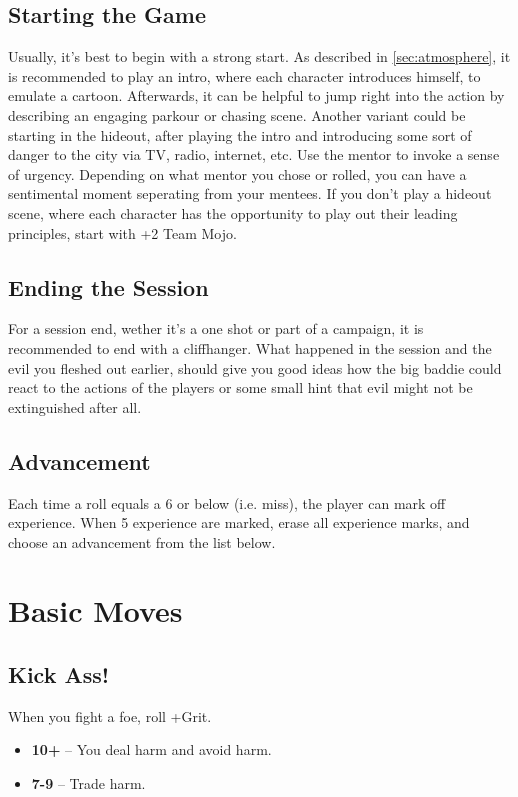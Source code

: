 \documentclass{book}
\begin{document}
\section*{Starting the Game}
Usually, it's best to begin with a strong start.
As described in \autoref{sec:atmosphere}, it is recommended to play an intro, where each character introduces himself, to emulate a cartoon.
Afterwards, it can be helpful to jump right into the action by describing an engaging parkour or chasing scene.
Another variant could be starting in the hideout, after playing the intro and introducing some sort of danger to the city via TV, radio, internet, etc.
Use the mentor to invoke a sense of urgency.
Depending on what mentor you chose or rolled, you can have a sentimental moment seperating from your mentees.
If you don't play a hideout scene, where each character has the opportunity to play out their leading principles, start with +2 Team Mojo.

\section*{Ending the Session}
For a session end, wether it's a one shot or part of a campaign, it is recommended to end with a cliffhanger.
What happened in the session and the evil you fleshed out earlier, should give you good ideas how the big baddie could react to the actions of the players or some small hint that evil might not be extinguished after all.

\section*{Advancement}
Each time a roll equals a 6 or below (i.e. miss), the player can mark off experience.
When 5 experience are marked, erase all experience marks, and choose an advancement from the list below.

\chapter*{Basic Moves}

\section*{Kick Ass!}
When you fight a foe, roll +Grit.
\begin{itemize}
    \item \textbf{10+} -- You deal harm and avoid harm.
    \item \textbf{7-9} -- Trade harm.
\end{itemize}
\end{document}
